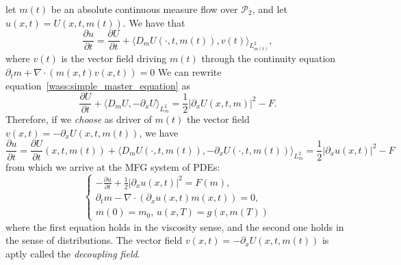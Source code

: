   let $m(t)$ be an absolute continuous measure flow over $\mathcal{P}_2$, and
  let $u(x,t) = U(x,t,m(t))$. We have that
\begin{equation}
    \frac{\partial u}{\partial t} = \frac{\partial U}{\partial t} + \langle D_m U (\cdot, t, m(t)), v(t) \rangle_{L^2_{m(t)}},
\end{equation}
    where $v(t)$ is the vector field driving $m(t)$ through the continuity equation $\partial_t m + \nabla \cdot( m(x,t) v(x,t) ) = 0$
    We can rewrite equation~\eqref{wass:simple_master_equation} as 
\begin{equation}
    \frac{\partial U}{ \partial t} + \langle D_m U, - \partial_x U \rangle_{L^2_m} = \frac{1}{2} |\partial_x U(x,t,m)|^2 - F.
\end{equation}
    Therefore, if we \textit{choose} as driver of $m(t)$ the vector field $v(x,t) = - \partial_x U(x,t,m(t))$,
    we have
\begin{equation}
    \frac{\partial u}{\partial t} =  \frac{\partial U}{ \partial t}(x,t,m(t)) + \langle D_m U(\cdot, t, m(t) ), - \partial_x U(\cdot, t, m(t) ) \rangle_{L^2_m} = \frac{1}{2} |\partial_x u(x,t)|^2 - F
\end{equation}
    from which we arrive at the MFG system of PDEs:
\begin{equation}
    \begin{cases}
        - \frac{\partial u}{\partial t} + \frac{1}{2} |\partial_x u(x,t)|^2  = F(m), \\
        \partial_t m - \nabla \cdot( \partial_x u(x,t) m(x,t) ) = 0,\\
        m(0) = m_0, \, u(x,T) = g(x, m(T))
    \end{cases}
\end{equation}
    where the first equation holds in the viscosity sense, and the second
    one holds in the sense of distributions.
    The vector field $v(x,t) = -\partial_x U(x,t,m(t))$ is aptly called the \textit{decoupling field}.